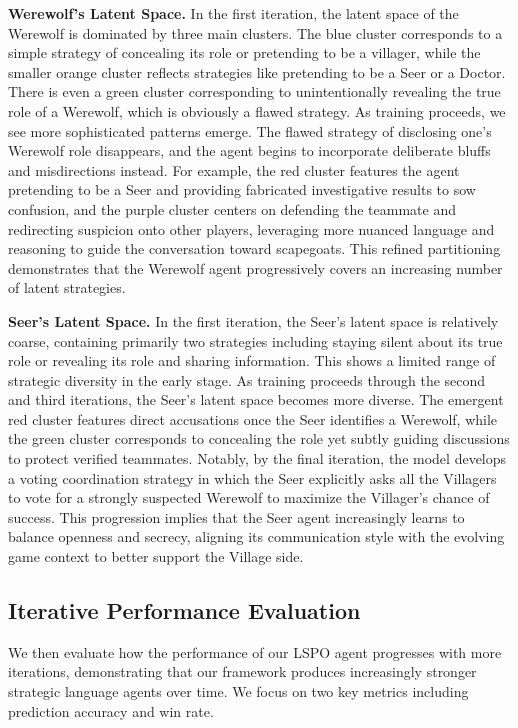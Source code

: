\textbf{Werewolf's Latent Space.}
In the first iteration, the latent space of the Werewolf is dominated by three main clusters. The blue cluster corresponds to a simple strategy of concealing its role or pretending to be a villager, while the smaller orange cluster reflects strategies like pretending to be a Seer or a Doctor. There is even a green cluster corresponding to unintentionally revealing the true role of a Werewolf, which is obviously a flawed strategy. As training proceeds, we see more sophisticated patterns emerge. The flawed strategy of disclosing one's Werewolf role disappears, and the agent begins to incorporate deliberate bluffs and misdirections instead. For example, the red cluster features the agent pretending to be a Seer and providing fabricated investigative results to sow confusion, and the purple cluster centers on defending the teammate and redirecting suspicion onto other players, leveraging more nuanced language and reasoning to guide the conversation toward scapegoats. This refined partitioning demonstrates that the Werewolf agent progressively covers an increasing number of latent strategies.


\textbf{Seer's Latent Space.}
In the first iteration, the Seer’s latent space is relatively coarse, containing primarily two strategies including staying silent about its true role or revealing its role and sharing information. This shows a limited range of strategic diversity in the early stage. As training proceeds through the second and third iterations, the Seer’s latent space becomes more diverse. The emergent red cluster features direct accusations once the Seer identifies a Werewolf, while the green cluster corresponds to concealing the role yet subtly guiding discussions to protect verified teammates. Notably, by the final iteration, the model develops a voting coordination strategy in which the Seer explicitly asks all the Villagers to vote for a strongly suspected Werewolf to maximize the Villager's chance of success. This progression implies that the Seer agent increasingly learns to balance openness and secrecy, aligning its communication style with the evolving game context to better support the Village side.


\subsection{Iterative Performance Evaluation}

We then evaluate how the performance of our LSPO agent progresses with more iterations, demonstrating that our framework produces increasingly stronger strategic language agents over time. We focus on two key metrics including 
prediction accuracy and win rate.

